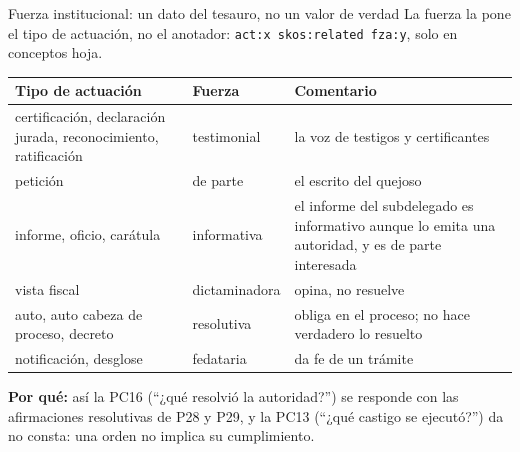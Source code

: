 \documentclass[aspectratio=169,10pt]{beamer}
\newcommand{\ttt}[1]{\texttt{\small #1}}
\newcommand{\porque}[1]{\par\smallskip\colorbox{ocre!10}{\parbox{\dimexpr\linewidth-2\fboxsep}{\footnotesize\textbf{Por qué:} #1}}}
\begin{document}
\begin{frame}[shrink=5]{Fuerza institucional: un dato del tesauro, no un valor de verdad}
\small
La fuerza la pone el \alert{tipo de actuación}, no el anotador: \ttt{act:x skos:related fza:y}, solo en conceptos hoja.

\medskip
\footnotesize
\begin{tabular}{@{}p{5.4cm}p{2.2cm}p{5.6cm}@{}}
\toprule
Tipo de actuación & Fuerza & Comentario \\
\midrule
certificación, declaración jurada, reconocimiento, ratificación & testimonial & la voz de testigos y certificantes \\
petición & de parte & el escrito del quejoso \\
informe, oficio, carátula & informativa & el informe del subdelegado es informativo aunque lo emita una autoridad, y es de \alert{parte interesada} \\
vista fiscal & dictaminadora & opina, no resuelve \\
auto, auto cabeza de proceso, decreto & resolutiva & obliga en el proceso; \alert{no hace verdadero} lo resuelto \\
notificación, desglose & fedataria & da fe de un trámite \\
\bottomrule
\end{tabular}
\porque{así la PC16 (\enquote{¿qué resolvió la autoridad?}) se responde con las afirmaciones resolutivas de P28 y P29, y la
PC13 (\enquote{¿qué castigo se ejecutó?}) da \alert{no consta}: una orden no implica su cumplimiento.}
\end{frame}
\end{document}
